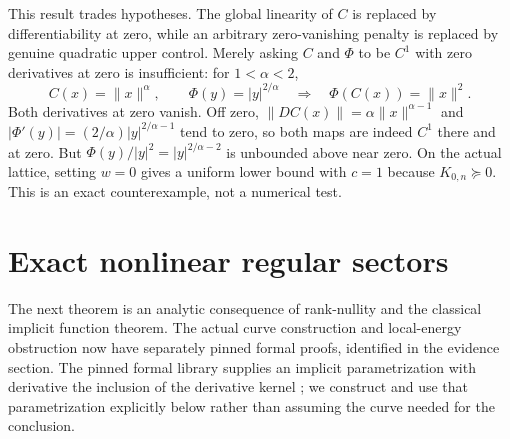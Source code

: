 \documentclass[11pt]{article}
\begin{document}
This result trades hypotheses. The global linearity of $C$ is replaced by
differentiability at zero, while an arbitrary zero-vanishing penalty is
replaced by genuine quadratic upper control. Merely asking $C$ and $\Phi$
to be $C^1$ with zero derivatives at zero is insufficient: for $1<\alpha<2$,
\[
 C(x)=\|x\|^\alpha,\qquad \Phi(y)=|y|^{2/\alpha}
 \quad\Longrightarrow\quad \Phi(C(x))=\|x\|^2.
\]
Both derivatives at zero vanish. Off zero,
$\|DC(x)\|=\alpha\|x\|^{\alpha-1}$ and
$|\Phi'(y)|=(2/\alpha)|y|^{2/\alpha-1}$ tend to zero, so both maps are indeed
$C^1$ there and at zero. But
$\Phi(y)/|y|^2=|y|^{2/\alpha-2}$ is unbounded above near zero. On the actual
lattice, setting $w=0$ gives a uniform lower bound with $c=1$ because
$K_{0,n}\succeq0$. This is an exact counterexample, not a numerical test.

\section{Exact nonlinear regular sectors}\label{sec:nonlinear-sector}
The next theorem is an analytic consequence of rank-nullity and the classical
implicit function theorem. The actual curve construction and local-energy obstruction now have separately pinned formal proofs, identified in the evidence section.
The pinned formal library supplies an implicit parametrization with derivative
the inclusion of the derivative kernel \cite{mathlib-implicit}; we construct
and use that parametrization explicitly below rather than assuming the curve
needed for the conclusion.
\end{document}
